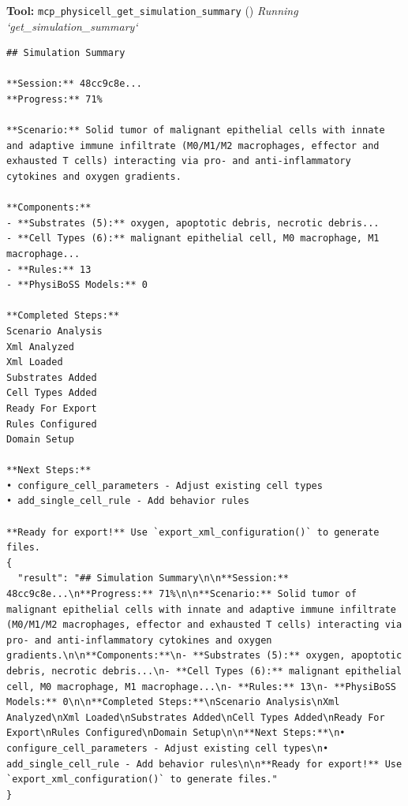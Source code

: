 \documentclass[11pt,a4paper]{article}
\begin{document}
\begin{toolokbox}
\textbf{Tool:} \texttt{mcp\_physicell\_get\_simulation\_summary} (\checkmark)
\textit{Running `get\_simulation\_summary`}
\begin{lstlisting}
## Simulation Summary

**Session:** 48cc9c8e...
**Progress:** 71%

**Scenario:** Solid tumor of malignant epithelial cells with innate and adaptive immune infiltrate (M0/M1/M2 macrophages, effector and exhausted T cells) interacting via pro- and anti-inflammatory cytokines and oxygen gradients.

**Components:**
- **Substrates (5):** oxygen, apoptotic debris, necrotic debris...
- **Cell Types (6):** malignant epithelial cell, M0 macrophage, M1 macrophage...
- **Rules:** 13
- **PhysiBoSS Models:** 0

**Completed Steps:**
Scenario Analysis
Xml Analyzed
Xml Loaded
Substrates Added
Cell Types Added
Ready For Export
Rules Configured
Domain Setup

**Next Steps:**
• configure_cell_parameters - Adjust existing cell types
• add_single_cell_rule - Add behavior rules

**Ready for export!** Use `export_xml_configuration()` to generate files.
{
  "result": "## Simulation Summary\n\n**Session:** 48cc9c8e...\n**Progress:** 71%\n\n**Scenario:** Solid tumor of malignant epithelial cells with innate and adaptive immune infiltrate (M0/M1/M2 macrophages, effector and exhausted T cells) interacting via pro- and anti-inflammatory cytokines and oxygen gradients.\n\n**Components:**\n- **Substrates (5):** oxygen, apoptotic debris, necrotic debris...\n- **Cell Types (6):** malignant epithelial cell, M0 macrophage, M1 macrophage...\n- **Rules:** 13\n- **PhysiBoSS Models:** 0\n\n**Completed Steps:**\nScenario Analysis\nXml Analyzed\nXml Loaded\nSubstrates Added\nCell Types Added\nReady For Export\nRules Configured\nDomain Setup\n\n**Next Steps:**\n• configure_cell_parameters - Adjust existing cell types\n• add_single_cell_rule - Add behavior rules\n\n**Ready for export!** Use `export_xml_configuration()` to generate files."
}
\end{lstlisting}
\end{toolokbox}
\end{document}
